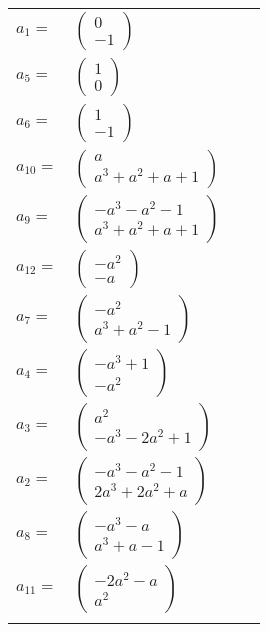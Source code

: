 \documentclass[1p]{elsarticle_modified}
\theoremstyle{definition}
\begin{document}
\begin{tabular}{m{7pt} m{180pt} m{7pt} m{180pt} }
\flushright $a_{1}=$&$\begin{pmatrix}0\\-1\end{pmatrix}$ \\
\flushright $a_{5}=$&$\begin{pmatrix}1\\0\end{pmatrix}$ \\
\flushright $a_{6}=$&$\begin{pmatrix}1\\-1\end{pmatrix}$ \\
\flushright $a_{10}=$&$\begin{pmatrix}a\\a^3+a^2+a+1\end{pmatrix}$ \\
\flushright $a_{9}=$&$\begin{pmatrix}- a^3- a^2-1\\a^3+a^2+a+1\end{pmatrix}$ \\
\flushright $a_{12}=$&$\begin{pmatrix}- a^2\\- a\end{pmatrix}$ \\
\flushright $a_{7}=$&$\begin{pmatrix}- a^2\\a^3+a^2-1\end{pmatrix}$ \\
\flushright $a_{4}=$&$\begin{pmatrix}- a^3+1\\- a^2\end{pmatrix}$ \\
\flushright $a_{3}=$&$\begin{pmatrix}a^2\\- a^3-2 a^2+1\end{pmatrix}$ \\
\flushright $a_{2}=$&$\begin{pmatrix}- a^3- a^2-1\\2 a^3+2 a^2+a\end{pmatrix}$ \\
\flushright $a_{8}=$&$\begin{pmatrix}- a^3- a\\a^3+a-1\end{pmatrix}$ \\
\flushright $a_{11}=$&$\begin{pmatrix}-2 a^2- a\\a^2\end{pmatrix}$\\&\end{tabular}
\end{document}
